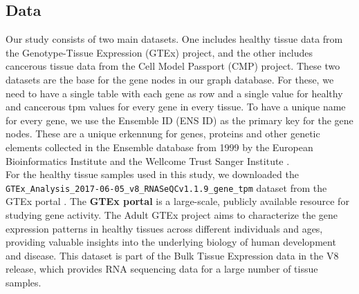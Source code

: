 \subsection{Data} \label{subsec:data}



Our study consists of two main datasets.
One includes healthy tissue data from the Genotype-Tissue Expression (GTEx) project,
and the other includes cancerous tissue data from the Cell Model Passport (CMP) project.
These two datasets are the base for the gene nodes in our graph database.
For these, we need to have a single table with each gene as row and a single value for healthy and cancerous tpm values for every gene in every tissue.
To have a unique name for every gene, we use the Ensemble ID (ENS ID) as the primary key for the gene nodes.
These are a unique erkennung for genes, proteins and other genetic elements collected in the Ensemble database
from 1999 by the European Bioinformatics Institute and the Wellcome Trust Sanger Institute \cite{ensembl_project}.
\\

For the healthy tissue samples used in this study,
we downloaded the \texttt{GTEx\_Analysis\_2017-06-05\_v8\_RNASeQCv1.1.9\_gene\_tpm} dataset from the GTEx portal \cite{gtex_download}.
The \textbf{GTEx portal} is a large-scale, publicly available resource for studying gene activity.
The Adult GTEx project aims to characterize the gene expression patterns in healthy tissues across different individuals and ages,
providing valuable insights into the underlying biology of human development and disease.
This dataset is part of the Bulk Tissue Expression data in the V8 release,
which provides RNA sequencing data for a large number of tissue samples.


